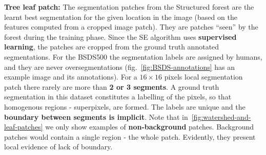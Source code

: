 \textbf{Tree leaf patch:} The segmentation patches from the Structured forest are the learnt best segmentation for the given location in the image (based on the features computed from a cropped image patch). They are patches ``seen'' by the forest during the training phase. Since the SE algorithm uses \textbf{supervised learning}, the patches are cropped from the ground truth annotated segmentations. 
For the BSDS500 the segmentation labels  are assigned by humans, and they are never oversegmentations (fig.~\ref{fig:BSDS-annotations} has an example image and its annotations). 
For a $16\times 16$ pixels local segmentation patch there rarely are more than \textbf{2 or 3 segments}. 
A ground truth segmentation in this dataset constitutes a labelling of the pixels, so that homogenous regions - superpixels, are formed. The labels are unique and the \textbf{boundary between segments is implicit}.
Note that in~\ref{fig:watershed-and-leaf-patches} we only show examples of \textbf{non-background} patches. Background patches would contain a single region - the whole patch. Evidently, they present local evidence of lack of boundary.

